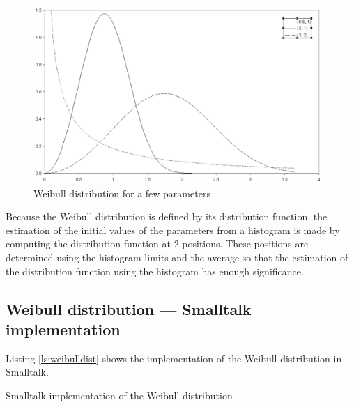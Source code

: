 \documentclass[twoside]{book}
\begin{document}
\begin{figure}
\centering\includegraphics[width=12cm]{Figures/WeibullDistribution}
\caption{Weibull distribution for a few
parameters}\label{fig:weibullDistr}
\end{figure}

Because the Weibull distribution is defined by its distribution
function, the estimation of the initial values of the parameters
from a histogram is made by computing the distribution function at
2 positions. These positions are determined using the histogram
limits and the average so that the estimation of the distribution
function using the histogram has enough significance.

\subsection{Weibull distribution --- Smalltalk  implementation}
\label{sec:weibull} Listing \ref{ls:weibulldist} shows the
implementation of the Weibull distribution in Smalltalk.

\begin{listing} Smalltalk implementation of the Weibull distribution \label{ls:weibulldist}

\end{listing}



\ifx\wholebook\relax\else
\end{document}
